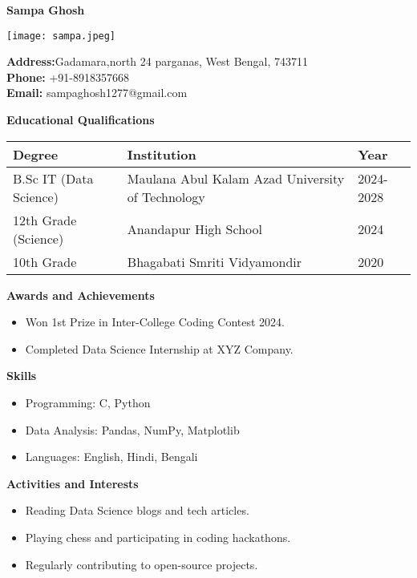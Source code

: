 \documentclass[12pt]{article}
\begin{document}
\begin{flushleft}
    \Huge \textbf{Sampa Ghosh}
\end{flushleft}

\begin{flushright}
    \texttt{[image: sampa.jpeg]}
\end{flushright}

\noindent
\textbf{Address:}Gadamara,north 24 parganas, West Bengal, 743711 \\
\textbf{Phone:} +91-8918357668 \\
\textbf{Email:} sampaghosh1277@gmail.com

\vspace{0.5cm}

\noindent
\textbf{\large Educational Qualifications}

\begin{tabular}{| m{5cm} | m{5cm} | m{3cm} |}
    \hline
    \textbf{Degree} & \textbf{Institution} & \textbf{Year} \\
    \hline
    B.Sc IT (Data Science) & Maulana Abul Kalam Azad University of Technology & 2024-2028 \\
    \hline
    12th Grade (Science) & Anandapur High School& 2024 \\
    \hline
    10th Grade & Bhagabati Smriti Vidyamondir & 2020 \\
    \hline
\end{tabular}

\vspace{0.5cm}

\noindent
\textbf{\large Awards and Achievements}
\begin{itemize}
    \item Won 1st Prize in Inter-College Coding Contest 2024.
    \item Completed Data Science Internship at XYZ Company.
\end{itemize}

\noindent
\textbf{\large Skills}
\begin{itemize}
    \item Programming: C, Python
    \item Data Analysis: Pandas, NumPy, Matplotlib
    \item Languages: English, Hindi, Bengali
\end{itemize}

\noindent
\textbf{\large Activities and Interests}
\begin{itemize}
    \item Reading Data Science blogs and tech articles.
    \item Playing chess and participating in coding hackathons.
    \item Regularly contributing to open-source projects.
\end{itemize}
\end{document}
